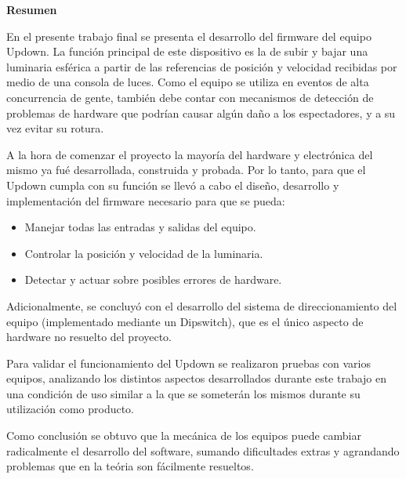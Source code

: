 \thispagestyle{empty}
\begin{center}

	\textbf{\huge Resumen }\\[1cm] 

\end{center}

En el presente trabajo final se presenta el desarrollo del firmware del equipo Updown. La función principal de este dispositivo es la de subir y bajar una luminaria esférica a partir de las referencias de posición y velocidad recibidas por medio de una consola de luces. Como el equipo se utiliza en eventos de alta concurrencia de gente, también debe contar con mecanismos de detección de problemas de hardware que podrían causar algún daño a los espectadores, y a su vez evitar su rotura.

A la hora de comenzar el proyecto la mayoría del hardware y electrónica del mismo ya fué desarrollada, construida y probada. Por lo tanto, para que el Updown cumpla con su función se llevó a cabo el diseño, desarrollo y implementación del firmware necesario para que se pueda:

\begin{itemize}
	\item Manejar todas las entradas y salidas del equipo.
	\item Controlar la posición y velocidad de la luminaria.
	\item Detectar y actuar sobre posibles errores de hardware.
\end{itemize}

Adicionalmente, se concluyó con el desarrollo del sistema de direccionamiento del equipo (implementado mediante un Dipswitch), que es el único aspecto de hardware no resuelto del proyecto.

Para validar el funcionamiento del Updown se realizaron pruebas con varios equipos, analizando los distintos aspectos desarrollados durante este trabajo en una condición de uso similar a la que se someterán los mismos durante su utilización como producto.

Como conclusión se obtuvo que la mecánica de los equipos puede cambiar radicalmente el desarrollo del software, sumando dificultades extras y agrandando problemas que en la teória son fácilmente resueltos.


